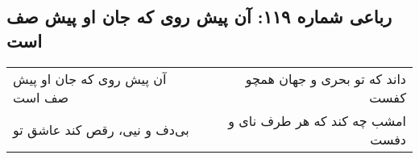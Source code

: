 \begin{center}
\section*{رباعی شماره ۱۱۹: آن پیش روی که جان او پیش صف است}
\label{sec:0119}
\begin{longtable}{l p{0.5cm} r}
آن پیش روی که جان او پیش صف است
&&
داند که تو بحری و جهان همچو کفست
\\
بی‌دف و نیی، رقص کند عاشق تو
&&
امشب چه کند که هر طرف نای و دفست
\\
\end{longtable}
\end{center}
